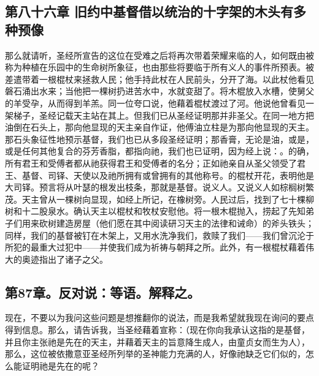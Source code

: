 
\subsection{第八十六章 旧约中基督借以统治的十字架的木头有多种预像}

 那么就请听，圣经所宣告的这位在受难之后将再次带着荣耀来临的人，如何既由被称为种植在乐园中的生命树所象征，也由那些将要临于所有义人的事件所预表。被差遣带着一根棍杖来拯救人民；他手持此杖在人民前头，分开了海。以此杖他看见磐石涌出水来；当他把一棵树扔进苦水中，水就变甜了。将木棍放入水槽，使舅父的羊受孕，从而得到羊羔。同一位夸口说，他藉着棍杖渡过了河。他说他曾看见一架梯子，圣经记载天主站在其上。但我们已从圣经证明那并非圣父。在同一地方把油倒在石头上，那向他显现的天主亲自作证，他傅油立柱是为那向他显现的天主。那石头象征性地预示基督，我们也已从多段圣经证明；那香膏，无论是油，或是，或是任何其他复合的芬芳香脂，都指向祂，我们也已证明，因为经上说：。的确，所有君王和受傅者都从祂获得君王和受傅者的名分；正如祂亲自从圣父领受了君王、基督、司铎、天使以及祂所拥有或曾拥有的其他称号。的棍杖开花，表明他是大司铎。预言将从叶瑟的根发出枝条，那就是基督。说义人。又说义人如棕榈树繁茂。天主曾从一棵树向显现，如经上所记，在橡树旁。人民过后，找到了七十棵柳树和十二股泉水。确认天主以棍杖和牧杖安慰他。将一根木棍抛入，捞起了先知弟子们用来砍树建造房屋（他们愿在其中阅读研习天主的法律和诫命）的斧头铁头；同样，我们的基督被钉在木架上，又用水洗净我们，救赎了我们——我们曾沉沦于所犯的最重大过犯中——并使我们成为祈祷与朝拜之所。此外，有一根棍杖藉着伟大的奥迹指出了诸子之父。\par


\subsection{第87章。反对说：等语。解释之。}

 现在，不要以为我问这些问题是想推翻你的说法，而是我希望就我现在询问的要点得到信息。那么，请告诉我，当圣经藉着宣称：（现在你向我承认这指的是基督，并且你主张祂是先在的天主，并藉着天主的旨意降生成人，由童贞女而生为人），那么，这位被依撒意亚圣经所列举的圣神能力充满的人，好像祂缺乏它们似的，怎么能证明祂是先在的呢？\par


